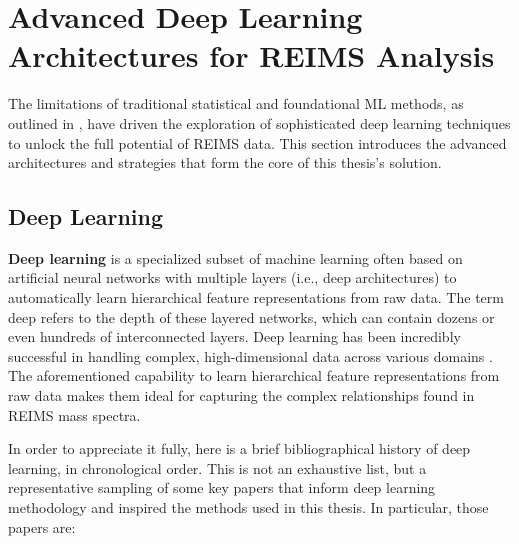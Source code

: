 \section{Advanced Deep Learning Architectures for REIMS Analysis}

The limitations of traditional statistical and foundational ML methods, as outlined in , have driven the exploration of sophisticated deep learning techniques to unlock the full potential of REIMS data. This section introduces the advanced architectures and strategies that form the core of this thesis's solution.

\subsection{Deep Learning}

\textbf{Deep learning} is a specialized subset of machine learning often based on artificial neural networks with multiple layers (i.e., deep architectures) to automatically learn hierarchical feature representations from raw data. The term deep refers to the depth of these layered networks, which can contain dozens or even hundreds of interconnected layers. Deep learning has been incredibly successful in handling complex, high-dimensional data across various domains \citep{Goodfellow2016}. The aforementioned capability to learn hierarchical feature representations from raw data makes them ideal for capturing the complex relationships found in REIMS mass spectra.

In order to appreciate it fully, here is a brief bibliographical history of deep learning, in chronological order. This is not an exhaustive list, but a representative sampling of some key papers that inform deep learning methodology and inspired the methods used in this thesis. In particular, those papers are:

